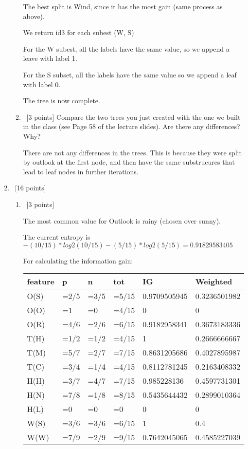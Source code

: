 \documentclass[12pt, fullpage,letterpaper]{article}
\begin{document}
\begin{enumerate}
\begin{enumerate}
The best split is Wind, since it has the most gain (same process as above).

We return id3 for each subest (W, S)

For the W subest, all the labels have the same value, so we append a leave with label 1.

For the S subset, all the labels have the same value so we append a leaf with label 0.

The tree is now complete.

	\item~[3 points] Compare the two trees you just created with the one we built in the class (see Page 58 of the lecture slides). Are there any differences? Why? 

There are not any differences in the trees. This is because they were split by outlook at the first node, and then have the same substrucures that lead to leaf nodes in further iterations.

\end{enumerate}

\item~[16 points] 
\begin{enumerate}
\item~[3 points] 

The most common value for Outlook is rainy (chosen over sunny). 

The current entropy is $-(10/15)*log2(10/15)-(5/15)*log2(5/15)= 0.91829583405$

For calculating the information gain:

\begin{tabular}{|l|l|l|l|l|l|}
	\hline
	feature & p    & n    & tot   & IG           & Weighted     \\ \hline
	O(S)    & =2/5 & =3/5 & =5/15 & 0.9709505945 & 0.3236501982 \\ \hline
	O(O)    & =1   & =0   & =4/15 & 0            & 0            \\ \hline
	O(R)    & =4/6 & =2/6 & =6/15 & 0.9182958341 & 0.3673183336 \\ \hline
	T(H)    & =1/2 & =1/2 & =4/15 & 1            & 0.2666666667 \\ \hline
	T(M)    & =5/7 & =2/7 & =7/15 & 0.8631205686 & 0.4027895987 \\ \hline
	T(C)    & =3/4 & =1/4 & =4/15 & 0.8112781245 & 0.2163408332 \\ \hline
	H(H)    & =3/7 & =4/7 & =7/15 & 0.985228136  & 0.4597731301 \\ \hline
	H(N)    & =7/8 & =1/8 & =8/15 & 0.5435644432 & 0.2899010364 \\ \hline
	H(L)    & =0   & =0   & =0    & 0            & 0            \\ \hline
	W(S)    & =3/6 & =3/6 & =6/15 & 1            & 0.4          \\ \hline
	W(W)    & =7/9 & =2/9 & =9/15 & 0.7642045065 & 0.4585227039 \\ \hline
	\end{tabular}


\end{enumerate}
\end{enumerate}
\end{document}
